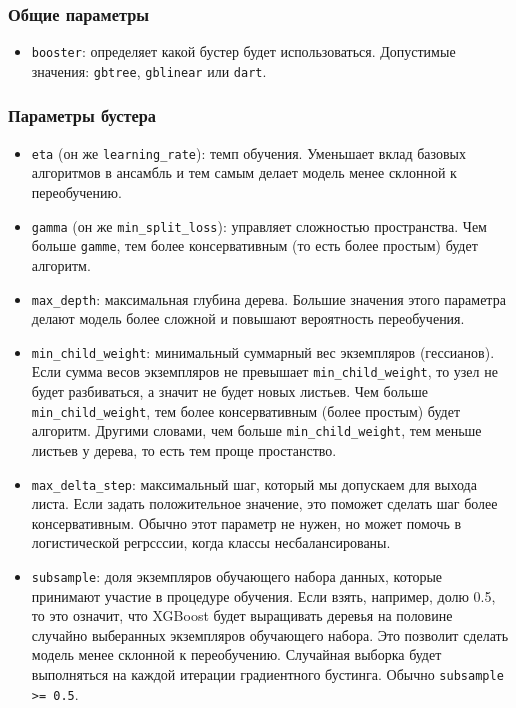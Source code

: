 \documentclass[%
	11pt,
	a4paper,
	utf8,
		]{article}
\begin{document}
\subsubsection{Общие параметры}

\begin{itemize}
	\item \verb|booster|: определяет какой бустер будет использоваться. Допустимые значения: \verb|gbtree|, \verb|gblinear| или \verb|dart|.
\end{itemize}

\subsubsection{Параметры бустера}

\begin{itemize}
	\item \verb|eta| (он же \verb|learning_rate|): темп обучения. Уменьшает вклад базовых алгоритмов в ансамбль и тем самым делает модель менее склонной к переобучению.
	
	\item \verb|gamma| (он же \verb|min_split_loss|): управляет сложностью пространства. Чем больше \verb|gamme|, тем более консервативным (то есть более простым) будет алгоритм.
	
	\item \verb|max_depth|: максимальная глубина дерева. Б\emph{о}льшие значения этого параметра делают модель более сложной и повышают вероятность переобучения.
	
	\item \verb|min_child_weight|: минимальный суммарный вес экземпляров (гессианов). Если сумма весов экземпляров не превышает \verb|min_child_weight|, то узел не будет разбиваться, а значит не будет новых листьев. Чем больше \verb|min_child_weight|, тем более консервативным (более простым) будет алгоритм. Другими словами, чем больше \verb|min_child_weight|, тем меньше листьев у дерева, то есть тем проще простанство.
	
	\item \verb|max_delta_step|: максимальный шаг, который мы допускаем для выхода листа. Если задать положительное значение, это поможет сделать шаг более консервативным. Обычно этот параметр не нужен, но может помочь в логистической регрсссии, когда классы несбалансированы. 
	
	\item \verb|subsample|: доля экземпляров обучающего набора данных, которые принимают участие в процедуре обучения. Если взять, например, долю 0.5, то это означит, что XGBoost будет выращивать деревья на половине случайно выберанных экземпляров обучающего набора. Это позволит сделать модель менее склонной к переобучению. Случайная выборка будет выполняться на каждой итерации градиентного бустинга. Обычно \verb|subsample >= 0.5|.
	

\end{itemize}
\end{document}

